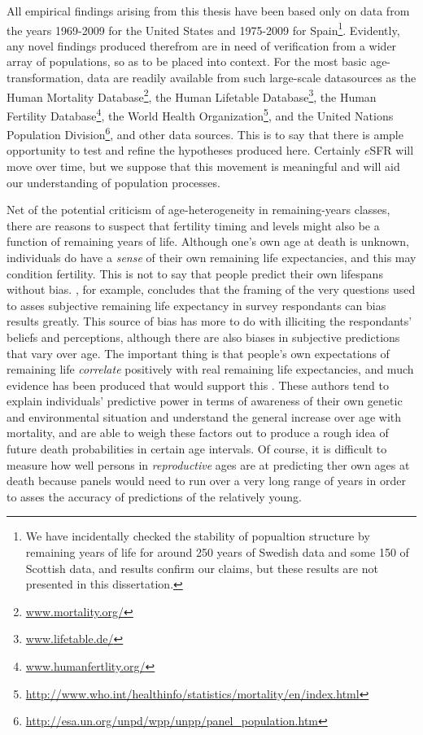 All empirical findings arising from this thesis have been based only on data
from the years 1969-2009 for the United States and 1975-2009 for
Spain\footnote{We have incidentally checked the stability of popualtion
structure by remaining years of life for around 250 years of Swedish data and some 150 of
Scottish data, and results confirm our claims, but these results are not presented in
this dissertation.}. Evidently, any novel findings produced therefrom are in
need of verification from a wider array of populations, so as to be placed into context. For the most basic age-transformation, data are readily available from such large-scale datasources as the Human Mortality Database\footnote{\url{www.mortality.org/}}, the Human Lifetable
Database\footnote{\url{www.lifetable.de/}}, the Human Fertility
Database\footnote{\url{www.humanfertlity.org/}}, the World Health
Organization\footnote{\url{http://www.who.int/healthinfo/statistics/mortality/en/index.html}},
and the United Nations Population
Division\footnote{\url{http://esa.un.org/unpd/wpp/unpp/panel_population.htm}},
and other data sources. This is to say that there is ample opportunity to test
and refine the hypotheses produced here. Certainly $e$SFR will move over time,
but we suppose that this movement is meaningful and will aid our understanding
of population processes.

Net of the potential criticism of age-heterogeneity in remaining-years classes,
there are reasons to suspect that fertility timing and levels might also be
a function of remaining years of life. Although one's own age at death is
unknown, individuals do have a \textit{sense} of their own remaining life
expectancies, and this may condition fertility. This is not to say that people 
predict their own lifespans without bias. \citet{payne2013life}, for example,
concludes that the framing of the very questions used to asses subjective
remaining life expectancy in survey respondants can bias results greatly. This
source of bias has more to do with illiciting the respondants' beliefs and
perceptions, although there are also biases in subjective predictions that vary
over age. The important thing is that people's own expectations of remaining 
life \textit{correlate} positively with real remaining life
expectancies, and much evidence has been produced that would support
this \citep{hurd1995evaluation, mirowsky1999subjective, hurd2002predictive,
perozek2008using, delavande2011differential, post2012longevity}. These authors
tend to explain individuals' predictive power in terms of awareness of
their own genetic and environmental situation and understand the general
increase over age with mortality, and are able to weigh these factors out to
produce a rough idea of future death probabilities in certain age intervals. Of
course, it is difficult to measure how well persons in \textit{reproductive}
ages are at predicting ther own ages at death because panels would need to
run over a very long range of years in order to asses the accuracy of
predictions of the relatively young.

